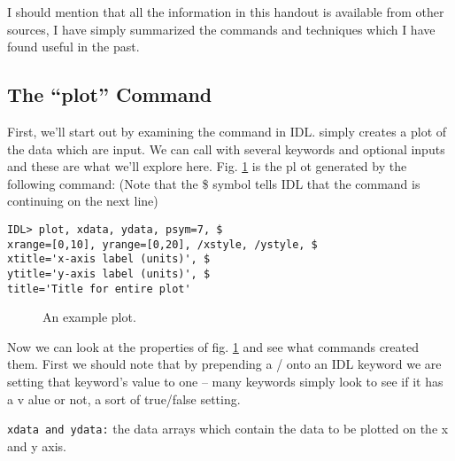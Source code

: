 	I should mention that all the information in this handout is
available from other sources\footnotemark, I have simply summarized the
commands and techniques which I have found useful in the past. 


\subsection{The ``plot'' Command}\label{plot}

	First, we'll start out by examining the \plot command in IDL. 
\plot simply creates a plot of the data which are input.  We can call
\plot with several keywords and optional inputs and these are what we'll
explore here.  Fig.  \ref{exampleplot1} is the pl ot generated by the
following command: (Note that the \$ symbol tells IDL that the command
is continuing on the next line)\footnotemark


\begin{verbatim}
IDL> plot, xdata, ydata, psym=7, $
xrange=[0,10], yrange=[0,20], /xstyle, /ystyle, $
xtitle='x-axis label (units)', $
ytitle='y-axis label (units)', $
title='Title for entire plot'
\end{verbatim}

\begin{figure}[!ht]
\begin{center}
{}
\end{center}
\caption{An example plot.}\label{exampleplot1}
\end{figure}

	Now we can look at the properties of fig.  \ref{exampleplot1}
and see what commands created them.  First we should note that by
prepending a / onto an IDL keyword we are setting that keyword's value
to one -- many keywords simply look to see if it has a v alue or not, a
sort of true/false setting. 

\verb&xdata and ydata:& the data arrays which contain the data to be
plotted on the x and y axis. 

